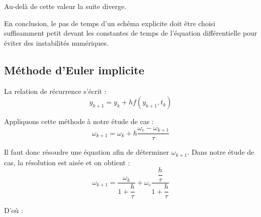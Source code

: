 \documentclass[10pt,fleqn]{article} %
\begin{document}
Au-delà de  cette valeur la suite diverge.

En conclusion, le pas de temps d’un schéma explicite doit être choisi suffisamment petit devant les constantes de temps de l’équation différentielle pour éviter des instabilités numériques.

\subsection{Méthode d'Euler implicite}
\begin{resultat}
La relation de récurrence s’écrit : 
$$y_{k+1}=y_k+hf(y_{k+1},t_k)$$
\end{resultat}

Appliquons cette méthode à notre étude de cas :
$$\omega_{{k+1}}=\omega_{k}+h \dfrac{\omega_c-\omega_{{k+1}}}{\tau}$$

Il faut donc résoudre une équation afin de déterminer $\omega_{{k+1}}$. Dans notre étude de cas, la résolution est aisée et on obtient :
$$\omega_{{k+1}}=\dfrac{\omega_{k}}{1+\dfrac{h}{\tau}}+\omega_c \dfrac{\dfrac{h}{\tau}}{1+\dfrac{h}{\tau}}$$

D’où :
\end{document}
